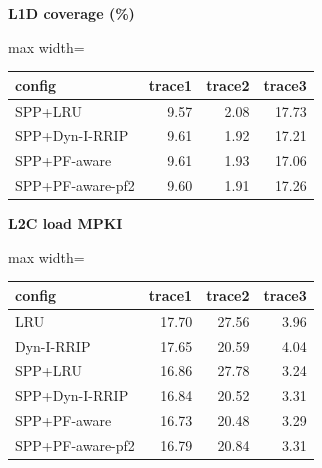 \documentclass[10pt]{article}
\begin{document}
\begin{center}
\begin{minipage}[t]{0.48\linewidth}\centering
\textbf{L1D coverage (\%)}\\[3pt]
\begin{adjustbox}{max width=\linewidth}
\begin{tabular}{@{}lrrr@{}}
\toprule
\textbf{config} & \textbf{trace1} & \textbf{trace2} & \textbf{trace3} \\
\midrule
SPP+LRU & 9.57 & 2.08 & 17.73 \\
SPP+Dyn-I-RRIP & 9.61 & 1.92 & 17.21 \\
SPP+PF-aware & 9.61 & 1.93 & 17.06 \\
SPP+PF-aware-pf2 & 9.60 & 1.91 & 17.26 \\
\bottomrule
\end{tabular}
\end{adjustbox}
\end{minipage}\hfill
\begin{minipage}[t]{0.48\linewidth}\centering
\textbf{L2C load MPKI}\\[3pt]
\begin{adjustbox}{max width=\linewidth}
\begin{tabular}{@{}lrrr@{}}
\toprule
\textbf{config} & \textbf{trace1} & \textbf{trace2} & \textbf{trace3} \\
\midrule
LRU & 17.70 & 27.56 & 3.96 \\
Dyn-I-RRIP & 17.65 & 20.59 & 4.04 \\
SPP+LRU & 16.86 & 27.78 & 3.24 \\
SPP+Dyn-I-RRIP & 16.84 & 20.52 & 3.31 \\
SPP+PF-aware & 16.73 & 20.48 & 3.29 \\
SPP+PF-aware-pf2 & 16.79 & 20.84 & 3.31 \\
\bottomrule
\end{tabular}
\end{adjustbox}
\end{minipage}
\end{center}
\medskip
\end{document}
